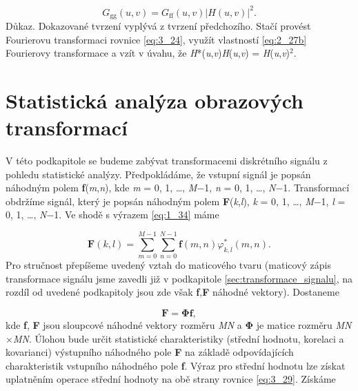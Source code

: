 \begin{equation} \label{eq:3_27}
    G_{\mathrm{gg}}(u, v) = G_{\mathrm{ff}}(u, v) | H(u, v) |^2.
\end{equation}
\textrm{Důkaz.} Dokazované tvrzení vyplývá z tvrzení předchozího. Stačí provést Fourierovu transformaci rovnice \eqref{eq:3_24}, využít vlastností \eqref{eq:2_27b} Fourierovy transformace a vzít v úvahu, že  \textit{H}*(\textit{u},\textit{v})\textit{H}(\textit{u},\textit{v}) = \textbar \textit{H}(\textit{u},\textit{v})\textbar$^2$.

\section*{Statistická analýza obrazových transformací} \label{sec:statisticka_analyza_obrazovych_transformaci}

V této podkapitole se budeme zabývat transformacemi diskrétního signálu z pohledu statistické analýzy. Předpokládáme, že vstupní signál je popsán náhodným polem \textbf{f}(\textit{m},\textit{n}), kde \textit{m} = 0, 1, \dots, \textit{M}$-$1, \textit{n} = 0, 1, \dots, \textit{N}$-$1. Transformací obdržíme signál, který je popsán náhodným polem \textbf{F}(\textit{k},\textit{l}), \textit{k} = 0, 1, \dots, \textit{M}$-$1, \textit{l} = 0, 1, \dots, \textit{N}$-$1. Ve shodě s výrazem \eqref{eq:1_34} máme

\begin{equation} \label{eq:3_28}
    \mathbf{F}(k, l) = \sum\limits_{m=0}^{M-1}\sum\limits_{n=0}^{N-1} \mathbf{f}(m, n) \varphi_{k, l}^*(m, n).
\end{equation}
Pro stručnost přepíšeme uvedený vztah do maticového tvaru (maticový zápis transformace signálu jsme zavedli již v podkapitole \ref{sec:transformace_signalu}, na rozdíl od uvedené podkapitoly jsou zde však \textbf{f},\textbf{F} náhodné vektory). Dostaneme

\begin{equation} \label{eq:3_29}
    \mathbf{F} = \mathbf{\Phi}\mathbf{f},
\end{equation}
kde \textbf{f}, \textbf{F} jsou sloupcové náhodné vektory rozměru \textit{MN} a $\mathbf{\Phi}$ je matice rozměru \textit{MN}$\times$\textit{MN}. Úlohou bude určit statistické charakteristiky (střední hodnotu, korelaci a kovarianci) výstupního náhodného pole \textbf{F} na základě odpovídajících charakteristik vstupního náhodného pole \textbf{f}. Výraz pro střední hodnotu lze získat uplatněním operace střední hodnoty na obě strany rovnice \eqref{eq:3_29}. Získáme

